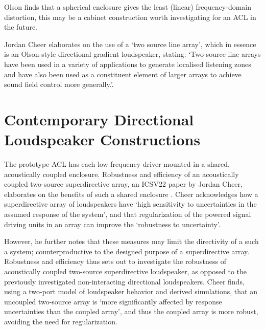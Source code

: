 \documentclass{report}
\begin{document}
        Olson finds that a spherical enclosure gives the least (linear) frequency-domain distortion, this may be a cabinet construction worth investigating for an ACL in the future. 

        Jordan Cheer elaborates on the use of a `two source line array', which in essence is an Olson-style directional gradient loudspeaker, stating: `Two-source line arrays have been used in a variety of applications to generate localised listening zones and have also been used as a constituent element of larger arrays to achieve sound field control more generally.'\cite{cheer2015robustness}.

    \section{Contemporary Directional Loudspeaker Constructions}
        The prototype ACL has each low-frequency driver mounted in a shared, acoustically coupled enclosure.
        Robustness and efficiency of an acoustically coupled two-source superdirective array, an ICSV22 paper by Jordan Cheer, elaborates on the benefits of such a shared enclosure \cite{cheer2015robustness}.
        Cheer acknowledges how a superdirective array of loudspeakers have `high sensitivity to uncertainties in the assumed response of the system', and that regularization of the powered signal driving units in an array can improve the `robustness to uncertainty'.
        
        However, he further notes that these measures may limit the directivity of a such a system; counterproductive to the designed purpose of a superdirective array.
        Robustness and efficiency thus sets out to investigate the robustness of acoustically coupled two-source superdirective loudspeaker, as opposed to the previously investigated non-interacting directional loudspeakers.
        Cheer finds, using a two-port model of loudspeaker behavior and derived simulations, that an uncoupled two-source array is `more significantly affected by response uncertainties than the coupled array', and thus the coupled array is more robust, avoiding the need for regularization.
        
\end{document}
